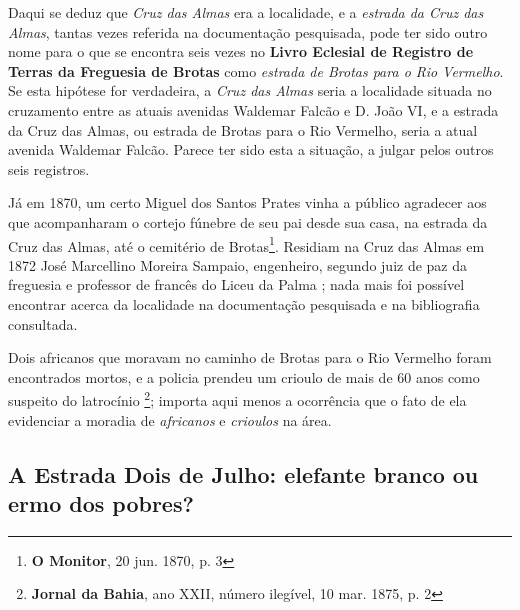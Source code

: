 Daqui se deduz que \textit{Cruz das Almas} era a localidade, e a \textit{estrada da Cruz das Almas}, tantas vezes referida na documentação pesquisada, pode ter sido outro nome para o que se encontra seis vezes no \textbf{Livro Eclesial de Registro de Terras da Freguesia de Brotas} como \textit{estrada de Brotas para o Rio Vermelho}. Se esta hipótese for verdadeira, a \textit{Cruz das Almas} seria a localidade situada no cruzamento entre as atuais avenidas Waldemar Falcão e D. João VI, e a estrada da Cruz das Almas, ou estrada de Brotas para o Rio Vermelho, seria a atual avenida Waldemar Falcão. Parece ter sido esta a situação, a julgar pelos outros seis registros.

Já em 1870, um certo Miguel dos Santos Prates vinha a público agradecer aos que acompanharam o cortejo fúnebre de seu pai desde sua casa, na estrada da Cruz das Almas, até o cemitério de Brotas\footnote{\textbf{O Monitor}, 20 jun. 1870, p. 3}. Residiam na Cruz das Almas em 1872 José Marcellino Moreira Sampaio, engenheiro, segundo juiz de paz da freguesia e professor de francês do Liceu da Palma \cite[segunda~parte, pp.~96]{pimenta_almanak_1872}; nada mais foi possível encontrar acerca da localidade na documentação pesquisada e na bibliografia consultada.

Dois africanos que moravam no caminho de Brotas para o Rio Vermelho foram encontrados mortos, e a policia prendeu um crioulo de mais de 60 anos como suspeito do latrocínio \footnote{\textbf{Jornal da Bahia}, ano XXII, número ilegível, 10 mar. 1875, p. 2}; importa aqui menos a ocorrência que o fato de ela evidenciar a moradia de \textit{africanos} e \textit{crioulos} na área.

\subsection{A Estrada Dois de Julho: elefante branco ou ermo dos pobres?}\label{subsec:e2j}

